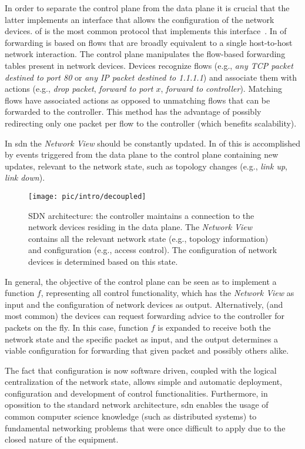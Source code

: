 In order to separate the control plane from the data plane it is crucial that the latter implements an interface that allows  the configuration of the network devices. 
\gls{of} is the most common protocol that implements this interface~\cite{openflow}.
In \gls{of} forwarding is based on flows that are broadly equivalent to a single host-to-host network interaction. 
The control plane  manipulates the flow-based forwarding tables present in network devices. 
Devices recognize flows (e.g., \emph{any TCP packet destined to port 80} or \emph{any IP packet destined to 1.1.1.1}) and associate them with actions (e.g., \emph{drop packet}, \emph{forward to port $x$}, \emph{forward to controller}). 
Matching flows have associated actions as opposed to unmatching flows that can be  forwarded to the controller. 
This method has the advantage of possibly redirecting only one packet per flow to the controller (which benefits scalability). 

In \gls{sdn} the  \emph{Network View} should be constantly updated. 
In \gls{of} this is accomplished by events triggered from the data plane to the control plane containing new updates, relevant to the network state,  such as topology changes (e.g., \emph{link up}, \emph{link down}).  
\begin{figure}[ht]
  \centering 
  \footnotesize
  \texttt{[image: pic/intro/decoupled]}
  \caption[SDN architecture]{SDN architecture: the controller maintains a connection to the network devices residing in the data plane. The \emph{Network View} contains all the relevant network state (e.g., topology information) and configuration (e.g., access control). The configuration of network devices is determined based on this state.}
  \label{fig:sdn.2d}
\end{figure}

In general, the objective of the control plane can be seen as to implement a function $f$, representing all control functionality, which has the \emph{Network View}  as  input and the configuration of network devices as output. 
Alternatively, (and most common) the devices can request forwarding advice to the controller for packets on the fly. 
In this case, function $f$  is expanded to receive both the network state and the specific packet as input, and the output determines  a viable configuration for forwarding that given packet and possibly others alike. 

The fact that configuration is now software driven, coupled with the logical centralization of the network state, allows simple and automatic deployment, configuration and development of  control functionalities. 
Furthermore, in  opossition to the standard network architecture, \gls{sdn} enables the usage of common computer science knowledge  (such as distributed systems)  to fundamental networking problems that were once difficult to apply due to the closed nature of the equipment. 

